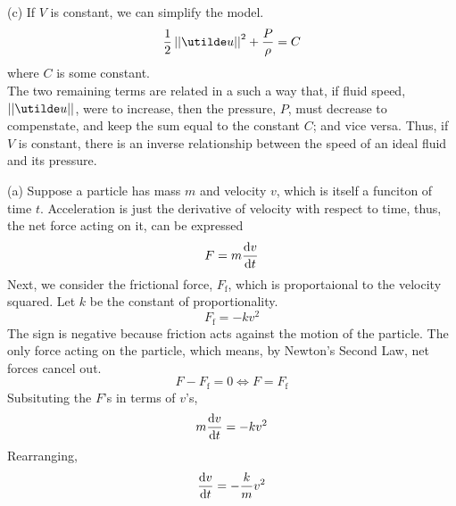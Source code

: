 \documentclass[a4paper, 11pt]{report}
\begin{document}
\sol (c) If $V$ is constant, we can simplify the model.
$$
	\frac{1}{2}\Mag{\ut{u}}^2 + \frac{P}{\rho} = C
$$
where $C$ is some constant. \\

The two remaining terms are related in a such a way that, if fluid speed, $\Mag{\ut{u}}$, were to increase, then the pressure, $P$, must decrease to compenstate, and keep the sum equal to the constant $C$; and vice versa. Thus, if $V$ is constant, there is an inverse relationship between the speed of an ideal fluid and its pressure.


\newpage
{}
\sol (a) Suppose a particle has mass $m$ and velocity $v$, which is itself a funciton of time $t$. Acceleration is just the derivative of velocity with respect to time, thus, the net force acting on it, can be expressed
$$
	F = m\dyd[v]{t}
$$
Next, we consider the frictional force, $F_\text{f}$, which is proportaional to the velocity squared. Let $k$ be the constant of proportionality.
$$
	F_{\text{f}} = -kv^2
$$
The sign is negative because friction acts against the motion of the particle. The only force acting on the particle, which means, by Newton's Second Law, net forces cancel out.
$$
	F - F_{\text{f}} = 0 \iff F = F_{\text{f}}
$$
Subsituting the $F$'s in terms of $v$'s,
$$
	m\dyd[v]{t} = -kv^2
$$
Rearranging,
$$
	\dyd[v]{t} = -\frac{k}{m}v^2
$$
\end{document}
